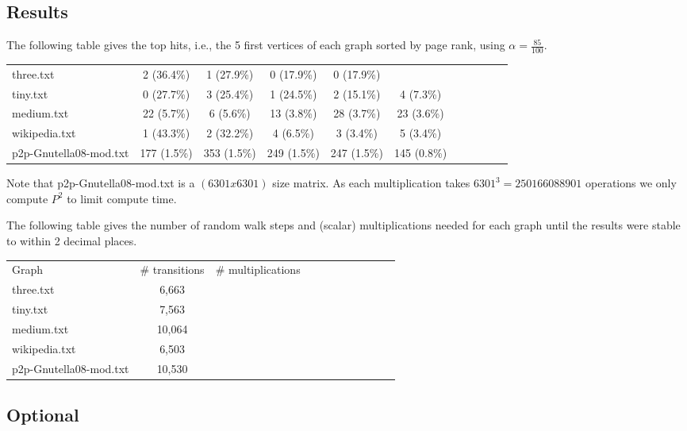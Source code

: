 \documentclass{tufte-handout}
\begin{document}
\subsection{Results}

The following table gives the top hits, i.e., the 5 first vertices of
each graph sorted by page rank, using $\alpha = \frac{85}{100}$.

\medskip
\begin{fullwidth}
\small
\begin{tabular}{lcccccccccc}
three.txt & 2 (36.4\%) & 1 (27.9\%) & 0 (17.9\%) & 0 (17.9\%) \\
tiny.txt & 0 (27.7\%) & 3 (25.4\%) & 1 (24.5\%) & 2 (15.1\%) & 4 (7.3\%) \\
medium.txt & 22 (5.7\%) & 6 (5.6\%) & 13 (3.8\%) & 28 (3.7\%) & 23 (3.6\%) \\
wikipedia.txt & 1 (43.3\%) & 2 (32.2\%) & 4 (6.5\%) & 3 (3.4\%) & 5 (3.4\%) \\
p2p-Gnutella08-mod.txt & 177 (1.5\%) & 353 (1.5\%) & 249 (1.5\%) & 247 (1.5\%) & 145 (0.8\%) \\
\end{tabular}
\end{fullwidth}

\medskip
Note that p2p-Gnutella08-mod.txt is a $(6301x6301)$ size matrix. As each multiplication takes $6301^3 = 250166088901$
operations we only compute $P^2$ to limit compute time.

\bigskip The following table gives the number of random walk steps and
(scalar) multiplications needed for each graph until the results were
stable to within 2 decimal places.

\medskip
\begin{fullwidth}
\small
\begin{tabular}{lcccccccccc}
Graph & \# transitions  & \# multiplications \\
three.txt & 6,663 \\
tiny.txt  & 7,563 \\
medium.txt & 10,064\\
wikipedia.txt & 6,503 \\
p2p-Gnutella08-mod.txt & 10,530
\end{tabular}
\end{fullwidth}

\subsection{Optional}
\end{document}
